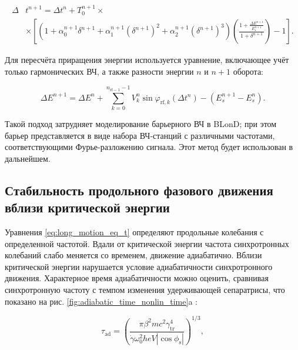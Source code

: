 \begin{equation} \label{eq:blond_dt_exact}
\begin{aligned}
 \Delta & t^{n+1}=\Delta t^n+T_0^{n+1}\times\\
& \times \left[\left(1+\alpha_0^{n+1} \delta^{n+1}+\alpha_1^{n+1}\left(\delta^{n+1}\right)^2+
\alpha_2^{n+1}\left(\delta^{n+1}\right)^3\right)\left(\frac{1+\frac{\Delta E^{n+1}}{E_s^{n+1}}}{1+\delta^{n+1}}\right)-1\right].
\end{aligned}
\end{equation}

\noindent Для пересчёта приращения энергии используется уравнение, включающее учёт только гармонических ВЧ, а также разности энергии $n$ и $n+1$ оборота:

\begin{equation} \label{eq:blond_dE}
\Delta E^{n+1}=\Delta E^n+\sum_{k=0}^{n_{\mathrm{rf}-1}-1} V_k^n \sin \varphi_{\mathrm{rf}, k}\left(\Delta t^n\right)-\left(E_s^{n+1}-E_s^n\right).
\end{equation}

\noindent Такой подход затрудняет моделирование барьерного ВЧ в BLonD; при этом барьер представляется в виде набора ВЧ-станций с различными частотами, соответствующими Фурье-разложению сигнала. Этот метод будет использован в дальнейшем.
	
	\subsection{Стабильность продольного фазового движения вблизи критической энергии}\label{sec:transition_jump/adiabaticity}
	
\par Уравнения \ref{eq:long_motion_eq_t} определяют продольные колебания с определенной частотой. Вдали от критической энергии частота синхротронных колебаний слабо меняется со временем, движение адиабатично. Вблизи критической энергии нарушается условие адиабатичности синхротронного движения. Характерное время адиабатичности можно оценить, сравнивая синхротронную частоту с темпом изменения удерживающей сепаратрисы, что показано на рис. \ref{fig:adiabatic_time_nonlin_time}a \cite{ng}:

\begin{equation}
\tau_{\textrm{ad}}=\left(\frac{\pi\beta^2mc^2\gamma_{\textrm{tr}}^4}{\dot{\gamma}\omega_0^2heV\left|\cos{\phi_{\textrm{s}}}\right|}\right)^{1/3},
\label{eq:adiabaticity}
\end{equation}

